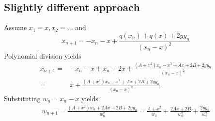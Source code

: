 \documentclass{scrartcl}
\theoremstyle{definition}
\begin{document}
\subsection*{Slightly different approach}
Assume $x_1 = x, x_2 = ...$ and
\begin{equation*}
    x_{n + 1} = -x_n - x + \frac {q(x_n) + q(x) + 2yy_n} {(x_n - x)^2}
\end{equation*}
Polynomial division yields
\begin{align*}
    x_{n + 1} =& -x_n - x + x_n + 2x + \frac {(A + x^2)x_n - x^3 + Ax + 2B + 2yy_n} {(x_n - x)^2} \\
    =& x + \frac {(A + x^2)x_n - x^3 + Ax + 2B + 2yy_n} {(x_n - x)^2}
\end{align*}
Substituting $w_n = x_n - x$ yields
\begin{align*}
    w_{n + 1} = \frac {(A + x^2)w_n + 2Ax + 2B + 2yy_n} {w_n^2} = \frac {A + x^2} {w_n} + \frac {2Ax + 2B} {w_n^2} + \frac {2yy_n} {w_n^2}
\end{align*}
\end{document}
